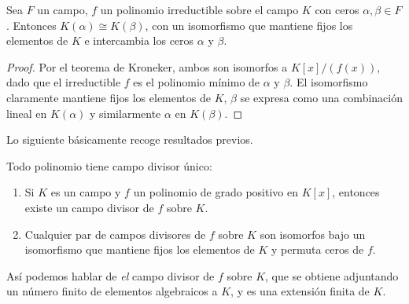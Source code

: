   \begin{theorem}
    \label{theo:splitting-field-roots}
    Sea \(F\) un campo,
    \(f\) un polinomio irreductible sobre el campo \(K\)
    con ceros \(\alpha, \beta \in F\).
    Entonces \(K(\alpha) \cong K(\beta)\),
    con un isomorfismo que mantiene fijos los elementos de \(K\)%
    e intercambia los ceros \(\alpha\) y \(\beta\).
  \end{theorem}
  \begin{proof}
    Por el teorema de Kroneker,
    ambos son isomorfos a \(K[x] / (f(x))\),
    dado que el irreductible \(f\)
    es el polinomio mínimo de \(\alpha\) y \(\beta\).
    El isomorfismo claramente mantiene fijos los elementos de \(K\),
    \(\beta\) se expresa
    como una combinación lineal en \(K(\alpha)\)
    y similarmente \(\alpha\) en \(K(\beta)\).
  \end{proof}

  Lo siguiente básicamente recoge resultados previos.
  \begin{theorem}
    \label{theo:E!-splitting-field}
    Todo polinomio tiene campo divisor único:
    \begin{enumerate}[label = (\roman*), ref = (\roman*)]
    \item
      Si \(K\) es un campo
      y \(f\) un polinomio de grado positivo en \(K[x]\),
      entonces existe un campo divisor de \(f\) sobre \(K\).
    \item
      Cualquier par de campos divisores de \(f\) sobre \(K\)
      son isomorfos bajo un isomorfismo
      que mantiene fijos los elementos de \(K\)
      y permuta ceros de \(f\).
    \end{enumerate}
  \end{theorem}
  Así podemos hablar
  de \emph{el} campo divisor de \(f\) sobre \(K\),
  que se obtiene
  adjuntando un número finito de elementos algebraicos a \(K\),
  y es una extensión finita de \(K\).

